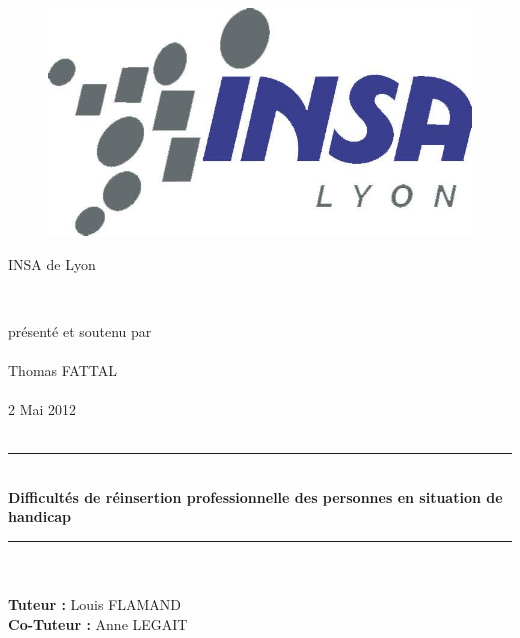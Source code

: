 \label{pagegarde}
\thispagestyle{empty}
{\large

\vspace*{-20mm}
\begin{figure}[H]
\begin{center}
\begin{minipage}{0.19\linewidth}
\includegraphics[width=\linewidth]{figures/insa.jpg}
\centering
\end{minipage}
\end{center}
\end{figure}


\vspace*{3cm}

\begin{center}

{\sf \large INSA de Lyon}



{} \\
\vspace{1cm}

présenté et soutenu par \\ \ \\ { Thomas FATTAL} \\ \
\\{2 Mai 2012}
\\ \ \\{\LARGE \hrule \ \\ \bf
Difficultés de réinsertion professionnelle des personnes en situation de handicap
\\ [3mm] \hrule} \ \\ \ \\
\vspace*{5mm}
{\bf Tuteur :} Louis FLAMAND \\
{\bf Co-Tuteur :} Anne LEGAIT \\ \ \\
\begin{center}


\end{center}
\end{center}}
